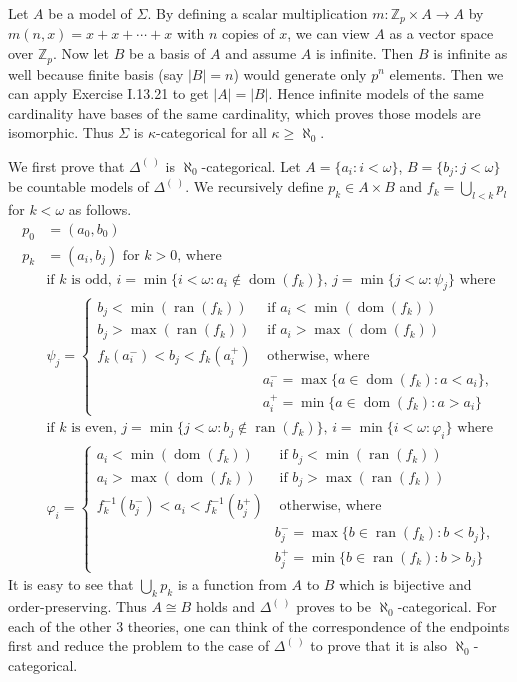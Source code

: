 \documentclass[12pt]{article}
\newcommand{\dom}{\mathop{\mathrm{dom}}}
\newcommand{\ran}{\mathop{\mathrm{ran}}}
\theoremstyle{definition}
\newenvironment{customthm}[1]
  {\renewcommand\theinnercustomthm{#1}\innercustomthm}
  {\endinnercustomthm}
\begin{document}
\begin{customthm}{II.13.8} Let $A$ be a model of $\Sigma$. By defining a scalar multiplication $m:\mathbb{Z}_p\times A\rightarrow A$ by $m(n,x)=x+x+\cdots+x$ with $n$ copies of $x$, we can view $A$ as a vector space over $\mathbb{Z}_p$. Now let $B$ be a basis of $A$ and assume $A$ is infinite. Then $B$ is infinite as well because finite basis (say $|B|=n$) would generate only $p^n$ elements. Then we can apply Exercise I.13.21 to get $|A|=|B|$. Hence infinite models of the same cardinality have bases of the same cardinality, which proves those models are isomorphic. Thus $\Sigma$ is $\kappa$-categorical for all $\kappa\geq\aleph_0$.
\end{customthm}

\begin{customthm}{II.13.10} We first prove that $\Delta^{(~)}$ is $\aleph_0$-categorical. Let $A=\{a_i:i<\omega\}$, $B=\{b_j:j<\omega\}$ be countable models of $\Delta^{(~)}$. We recursively define $p_k\in A\times B$ and $f_k=\bigcup_{l<k}p_l$ for $k<\omega$ as follows.
\begin{align*}
  p_0 &= (a_0, b_0) \\
  p_k &= (a_i, b_j) \text{ for } k>0 \text{, where} \\
  &\text{if } k \text{ is odd, } i=\min\{i<\omega:a_i\not\in\dom(f_k)\} \text{, } j=\min\{j<\omega:\psi_j\} \text{ where} \\
  &\psi_j=\begin{cases}
    b_j<\min(\ran(f_k)) &\text{ if } a_i<\min(\dom(f_k)) \\
    b_j>\max(\ran(f_k)) &\text{ if } a_i>\max(\dom(f_k)) \\
    f_k(a_i^-)<b_j<f_k(a_i^+) &\text{ otherwise, where } \\
    &a_i^-=\max\{a\in\dom(f_k):a<a_i\}, \\ &a_i^+=\min\{a\in\dom(f_k):a>a_i\}
  \end{cases} \\
  &\text{if } k \text{ is even, } j=\min\{j<\omega:b_j\not\in\ran(f_k)\} \text{, } i=\min\{i<\omega:\varphi_i\} \text{ where} \\
  &\varphi_i=\begin{cases}
    a_i<\min(\dom(f_k)) &\text{ if } b_j<\min(\ran(f_k)) \\
    a_i>\max(\dom(f_k)) &\text{ if } b_j>\max(\ran(f_k)) \\
    f_k^{-1}(b_j^-)<a_i<f_k^{-1}(b_j^+) &\text{ otherwise, where } \\
    &b_j^-=\max\{b\in\ran(f_k):b<b_j\}, \\ &b_j^+=\min\{b\in\ran(f_k):b>b_j\}
  \end{cases}
\end{align*}
It is easy to see that $\bigcup_kp_k$ is a function from $A$ to $B$ which is bijective and order-preserving. Thus $A\cong B$ holds and $\Delta^{(~)}$ proves to be $\aleph_0$-categorical. For each of the other 3 theories, one can think of the correspondence of the endpoints first and reduce the problem to the case of $\Delta^{(~)}$ to prove that it is also $\aleph_0$-categorical.


\end{customthm}
\end{document}
